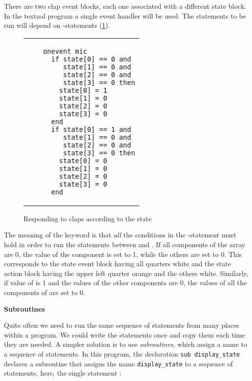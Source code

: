 There are two clap event blocks, each one associated with a different
state block. In the textual program a single  event handler will
be used. The statements to be run will depend on -statements
(\cref{fig.respond}).

\begin{figure}[hbt]
\begin{center}
\begin{tabular}{ll}
\raisebox{10ex}{\texttt{[image: two-clap]}} &
\begin{minipage}[b]{.5\textwidth}
\begin{footnotesize}
\begin{verbatim}
  onevent mic
    if state[0] == 0 and
       state[1] == 0 and
       state[2] == 0 and
       state[3] == 0 then
      state[0] = 1
      state[1] = 0
      state[2] = 0
      state[3] = 0
    end
    if state[0] == 1 and
       state[1] == 0 and
       state[2] == 0 and
       state[3] == 0 then
      state[0] = 0
      state[1] = 0
      state[2] = 0
      state[3] = 0
    end
\end{verbatim}
\end{footnotesize}
\end{minipage}
\end{tabular}
\caption{Responding to claps according to the state}\label{fig.respond}
\end{center}
\end{figure}

The meaning of the keyword  is that \emph{all} the conditions in
the -statement must hold in order to run the statements between
 and . If all components of the array  are 0,
the value of the component  is set to 1, while the others
are set to 0. This corresponds to the state event block having all
quarters white and the state action block having the upper left quarter
orange and the others white. Similarly, if value of  is 1
and the values of the other components are 0, the values of all the
components of  are set to 0.

\textbf{\large Subroutines}

Quite often we need to run the same sequence of statements from many
places within a program. We could write the statements once and copy
them each time they are needed. A simpler solution is to use
\emph{subroutines}, which assign a name to a sequence of statements. In
this program, the declaration \verb+sub display_state+ declares a
subroutine that assigns the name \verb+display_state+ to a sequence of
statements, here, the single statement :

